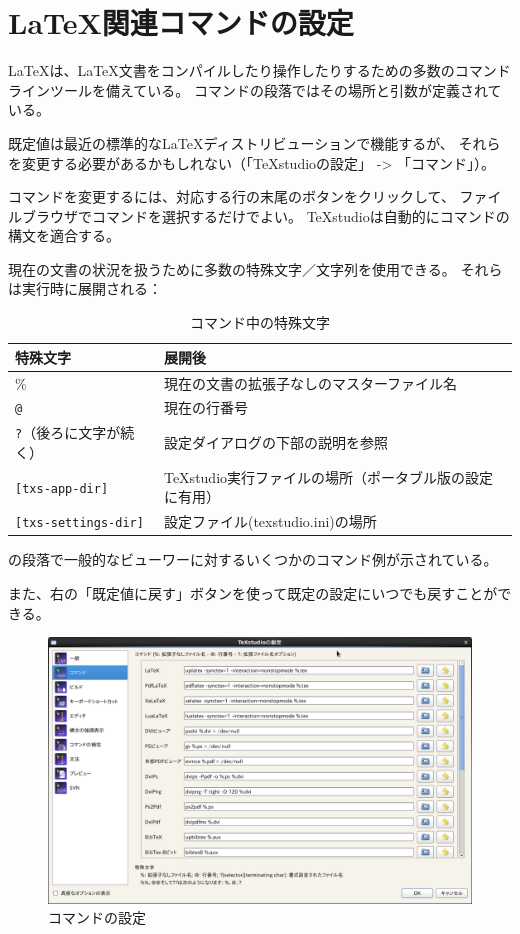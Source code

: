 \section{LaTeX関連コマンドの設定}

LaTeXは、LaTeX文書をコンパイルしたり操作したりするための多数のコマンドラインツールを備えている。
コマンドの段落ではその場所と引数が定義されている。

既定値は最近の標準的なLaTeXディストリビューションで機能するが、
それらを変更する必要があるかもしれない（「TeXstudioの設定」 -\textgreater{} 「コマンド」）。


コマンドを変更するには、対応する行の末尾のボタンをクリックして、
ファイルブラウザでコマンドを選択するだけでよい。
TeXstudioは自動的にコマンドの構文を適合する。

現在の文書の状況を扱うために多数の特殊文字／文字列を使用できる。
それらは実行時に展開される：

\begin{table}[H]
  \centering
  \caption{コマンド中の特殊文字}
  \begin{tabularx}{\linewidth}{lX}
    \hline
    \textbf{特殊文字} & \textbf{展開後}\\
    \hline
    \% & 現在の文書の拡張子なしのマスターファイル名\\
    \verb+@+ & 現在の行番号\\
    \verb+?+（後ろに文字が続く） & 設定ダイアログの下部の説明を参照\\
    \verb+[txs-app-dir]+ & TeXstudio実行ファイルの場所（ポータブル版の設定に有用）\\
    \verb+[txs-settings-dir]+ & 設定ファイル(texstudio.ini)の場所\\
    \hline
  \end{tabularx}
\end{table}

の段落で一般的なビューワーに対するいくつかのコマンド例が示されている。

また、右の「既定値に戻す」ボタンを使って既定の設定にいつでも戻すことができる。

\begin{figure}[H]
  \centering
  \includegraphics[width=.8\linewidth]{configure_commands.png}
  \caption{コマンドの設定}
\end{figure}

